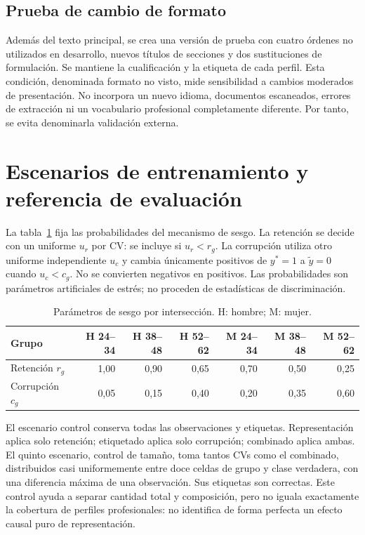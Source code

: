 \documentclass[11pt,a4paper,oneside]{report}
\begin{document}
\subsection{Prueba de cambio de formato}
Además del texto principal, se crea una versión de prueba con cuatro órdenes no utilizados en desarrollo, nuevos títulos de secciones y dos sustituciones de formulación. Se mantiene la cualificación y la etiqueta de cada perfil. Esta condición, denominada formato no visto, mide sensibilidad a cambios moderados de presentación. No incorpora un nuevo idioma, documentos escaneados, errores de extracción ni un vocabulario profesional completamente diferente. Por tanto, se evita denominarla validación externa.

\section{Escenarios de entrenamiento y referencia de evaluación}
La tabla~\ref{tab:probabilidades} fija las probabilidades del mecanismo de sesgo. La retención se decide con un uniforme $u_r$ por CV: se incluye si $u_r<r_g$. La corrupción utiliza otro uniforme independiente $u_c$ y cambia únicamente positivos de $y^*=1$ a $\tilde y=0$ cuando $u_c<c_g$. No se convierten negativos en positivos. Las probabilidades son parámetros artificiales de estrés; no proceden de estadísticas de discriminación.

\begin{table}[htbp]\centering\small
\caption{Parámetros de sesgo por intersección. H: hombre; M: mujer.}\label{tab:probabilidades}
\begin{tabular}{lrrrrrr}\toprule
Grupo & H 24--34&H 38--48&H 52--62&M 24--34&M 38--48&M 52--62\\\midrule
Retención $r_g$&1,00&0,90&0,65&0,70&0,50&0,25\\
Corrupción $c_g$&0,05&0,15&0,40&0,20&0,35&0,60\\\bottomrule
\end{tabular}\end{table}

El escenario control conserva todas las observaciones y etiquetas. Representación aplica solo retención; etiquetado aplica solo corrupción; combinado aplica ambas. El quinto escenario, control de tamaño, toma tantos CVs como el combinado, distribuidos casi uniformemente entre doce celdas de grupo y clase verdadera, con una diferencia máxima de una observación. Sus etiquetas son correctas. Este control ayuda a separar cantidad total y composición, pero no iguala exactamente la cobertura de perfiles profesionales: no identifica de forma perfecta un efecto causal puro de representación.
\end{document}
